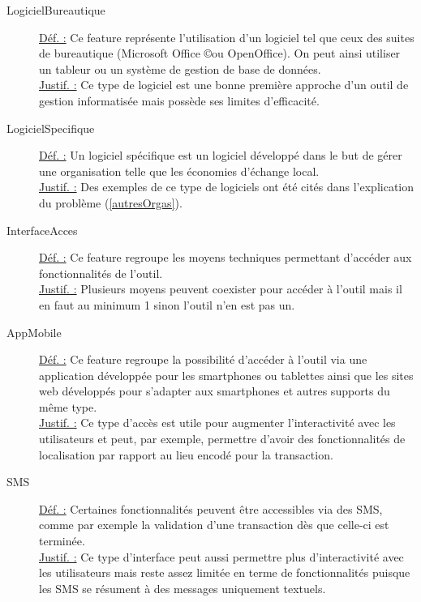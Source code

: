 \begin{description}
\item [LogicielBureautique]
\underline{Déf. :}  Ce feature représente l'utilisation d'un logiciel tel que ceux des suites de bureautique (Microsoft Office \copyright ou OpenOffice).  On peut ainsi utiliser un tableur ou un système de gestion de base de données.
\\ \underline{Justif. :}  Ce type de logiciel est une bonne première approche d'un outil de gestion informatisée mais possède ses limites d'efficacité.
\newline

\item [LogicielSpecifique]
\underline{Déf. :}  Un logiciel spécifique est un logiciel développé dans le but de gérer une organisation telle que les économies d'échange local.  
\\ \underline{Justif. :}  Des exemples de ce type de logiciels ont été cités dans l'explication du problème (\ref{autresOrgas}).  
\newline

\item [InterfaceAcces]
\underline{Déf. :}  Ce feature regroupe les moyens techniques permettant d'accéder aux fonctionnalités de l'outil.
\\ \underline{Justif. :}  Plusieurs moyens peuvent coexister pour accéder à l'outil mais il en faut au minimum 1 sinon l'outil n'en est pas un.
\newline

\item [AppMobile]
\underline{Déf. :}  Ce feature regroupe la possibilité d'accéder à l'outil via une application développée pour les smartphones ou tablettes ainsi que les sites web développés pour s'adapter aux smartphones et autres supports du même type.  
\\ \underline{Justif. :}   Ce type d'accès est utile pour augmenter l'interactivité avec les utilisateurs et peut,  par exemple,  permettre d'avoir des fonctionnalités de localisation par rapport au lieu encodé pour la transaction.
\newline

\item [SMS]
\underline{Déf. :}  Certaines fonctionnalités peuvent être accessibles via des SMS,  comme par exemple la validation d'une transaction dès que celle-ci est terminée.
\\ \underline{Justif. :}  Ce type d'interface peut aussi permettre plus d'interactivité avec les utilisateurs mais reste assez limitée en terme de fonctionnalités puisque les SMS se résument à des messages uniquement textuels. 
\newline


\end{description}
